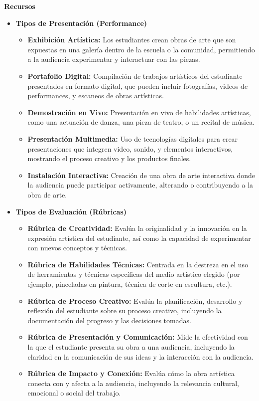 {\large \textbf{Recursos}}
\begin{itemize}
    \item \textbf{Tipos de Presentación (Performance)}
    \begin{itemize}
        \item \textbf{Exhibición Artística:}
        Los estudiantes crean obras de arte que son expuestas en una galería dentro de la escuela o la comunidad, permitiendo a la audiencia experimentar y interactuar con las piezas.
        \item \textbf{Portafolio Digital:}
        Compilación de trabajos artísticos del estudiante presentados en formato digital, que pueden incluir fotografías, videos de performances, y escaneos de obras artísticas.
        \item \textbf{Demostración en Vivo:}
        Presentación en vivo de habilidades artísticas, como una actuación de danza, una pieza de teatro, o un recital de música.
        \item \textbf{Presentación Multimedia:}
        Uso de tecnologías digitales para crear presentaciones que integren video, sonido, y elementos interactivos, mostrando el proceso creativo y los productos finales.
        \item \textbf{Instalación Interactiva:}
        Creación de una obra de arte interactiva donde la audiencia puede participar activamente, alterando o contribuyendo a la obra de arte.
    \end{itemize}
    \item \textbf{Tipos de Evaluación (Rúbricas)}
    \begin{itemize}
        \item \textbf{Rúbrica de Creatividad:}
        Evalúa la originalidad y la innovación en la expresión artística del estudiante, así como la capacidad de experimentar con nuevos conceptos y técnicas.
        \item \textbf{Rúbrica de Habilidades Técnicas:}
        Centrada en la destreza en el uso de herramientas y técnicas específicas del medio artístico elegido (por ejemplo, pinceladas en pintura, técnica de corte en escultura, etc.).
        \item \textbf{Rúbrica de Proceso Creativo:}
        Evalúa la planificación, desarrollo y reflexión del estudiante sobre su proceso creativo, incluyendo la documentación del progreso y las decisiones tomadas.
        \item \textbf{Rúbrica de Presentación y Comunicación:}
        Mide la efectividad con la que el estudiante presenta su obra a una audiencia, incluyendo la claridad en la comunicación de sus ideas y la interacción con la audiencia.
        \item \textbf{Rúbrica de Impacto y Conexión:}
        Evalúa cómo la obra artística conecta con y afecta a la audiencia, incluyendo la relevancia cultural, emocional o social del trabajo.
    \end{itemize}
\end{itemize}



